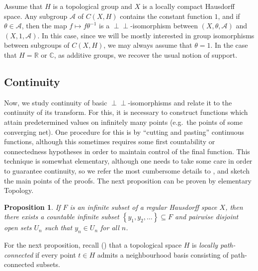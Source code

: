 \documentclass[letter,11pt]{amsart}
\theoremstyle{plain}		\newtheorem{theorem}[generalnumbering]{Theorem}
\theoremstyle{plain}		\newtheorem{corollary}[generalnumbering]{Corollary}
\theoremstyle{definition}		\newtheorem{definition}[generalnumbering]{Definition}
\theoremstyle{definition}		\newtheorem{example}[generalnumbering]{Example}
\theoremstyle{plain}		\newtheorem{proposition}[generalnumbering]{Proposition}
\theoremstyle{plain}		\newtheorem{lemma}[generalnumbering]{Lemma}
\theoremstyle{plain}    \newtheorem{plainstyle}[generalnumbering]{\namefordifferentenvironment}
\theoremstyle{plain}    \newtheorem*{plainstyle*}{\namefordifferentenvironment}
\theoremstyle{definition}    \newtheorem{definitionstyle}[generalnumbering]{\namefordifferentenvironment}
\theoremstyle{definition}    \newtheorem*{definitionstyle*}{\namefordifferentenvironment}
\newcommand{\perpp}{\perp\!\!\!\perp}
\begin{document}
Assume that $H$ is a topological group and $X$ is a locally compact Hausdorff space. Any subgroup $\mathcal{A}$ of $C(X,H)$ contains the constant function $1$, and if $\theta\in\mathcal{A}$, then the map $f\mapsto f\theta^{-1}$ is a $\perpp$-isomorphism between $(X,\theta,\mathcal{A})$ and $(X,1,\mathcal{A})$. In this case, since we will be mostly interested in group isomorphisms between subgroups of $C(X,H)$, we may always assume that $\theta=1$. In the case that $H=\mathbb{R}$ or $\mathbb{C}$, as additive groups, we recover the usual notion of support.

\subsection{Continuity}

Now, we study continuity of basic $\perpp$-isomorphisms and relate it to the continuity of its transform. For this, it is necessary to construct functions which attain predetermined values on infinitely many points (e.g.\ the points of some converging net). One procedure for this is by ``cutting and pasting'' continuous functions, although this sometimes requires some first countability or connectedness hypotheses in order to maintain control of the final function. This technique is somewhat elementary, although one needs to take some care in order to guarantee continuity, so we refer the most cumbersome details to \cite[Section 3.3.3]{cordeirothesis}, and sketch the main points of the proofs. The next proposition can be proven by elementary Topology.

\begin{proposition}\label{propositiondisjointopensets}
	If $F$ is an infinite subset of a regular Hausdorff space $X$, then there exists a countable infinite subset $\left\{y_1,y_2,\ldots\right\}\subseteq F$ and pairwise disjoint open sets $U_n$ such that $y_n\in U_n$ for all $n$.
\end{proposition}

For the next proposition, recall (\cite[27.4]{MR0264581}) that a topological space $H$ is \emph{locally path-connected} if every point $t\in H$ admits a neighbourhood basis consisting of path-connected subsets.
\end{document}

